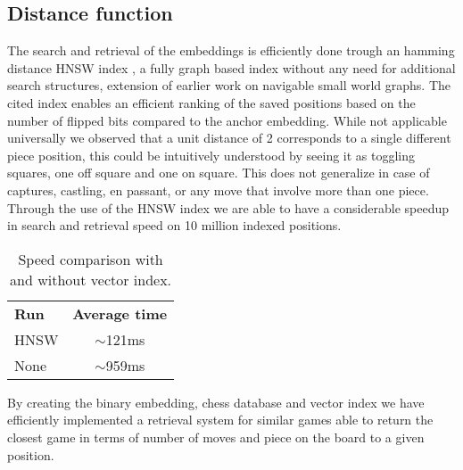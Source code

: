 \subsection{Distance function}
The search and retrieval of the embeddings is efficiently done trough an hamming distance HNSW index \cite{retrieval:hnsw},
a fully graph based index without any need for additional search structures, extension of earlier work on navigable small world graphs. 
\newline
The cited index enables an efficient ranking of the saved positions based on the number of flipped bits compared to the anchor embedding.
\newline
While not applicable universally we observed that a unit distance of 2 corresponds to a single different piece position, 
this could be intuitively understood by seeing it as toggling squares, one off square and one on square. 
\newline %
This does not generalize in case of captures, castling, en passant, or any move that involve more than one piece.
\pagebreak
Through the use of the HNSW index we are able to have a considerable speedup in search and retrieval speed on 10 million indexed positions.
\begin{table}[ht]
\centering
\caption{Speed comparison with and without vector index.}
\label{retrieval:table:vectorindex}
\begin{tabular}{lc}
\textbf{Run} & \textbf{Average time} \\
HNSW & $\sim$121ms \\
None & $\sim$959ms 
\end{tabular}
\end{table}
By creating the binary embedding, chess database and vector index we have efficiently implemented a retrieval system for similar games able to return
the closest game in terms of number of moves and piece on the board to a given position.

